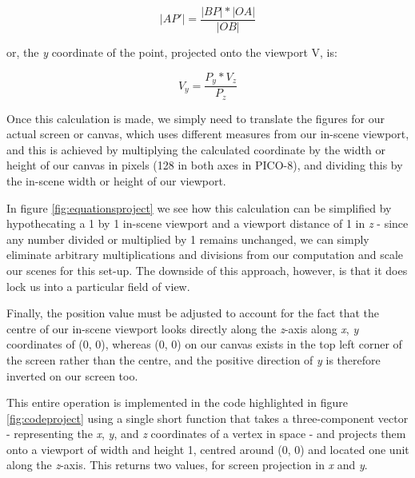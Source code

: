 \documentclass[11pt]{article}
\begin{document}
\begin{equation}
   |AP'| = \frac{|BP| * |OA|} {|OB|}
\end{equation}

or, the \textit{y} coordinate of the point, projected onto the viewport V, is:

\begin{equation}
   V_y = \frac{P_y * V_z} {P_z}
\end{equation}

Once this calculation is made, we simply need to translate the figures for our actual screen or canvas, which uses different
measures from our in-scene viewport, and this is achieved by multiplying the calculated coordinate by the width or height of
our canvas in pixels (128 in both axes in PICO-8), and dividing this by the in-scene width or height of our viewport.

In figure \ref{fig:equationsproject} we see how this calculation can be simplified by hypothecating a 1 by 1 in-scene viewport and
a viewport distance of 1 in \textit{z} - since any number divided or multiplied by 1 remains unchanged, we can simply eliminate
arbitrary multiplications and divisions from our computation and scale our scenes for this set-up. The downside of this approach,
however, is that it does lock us into a particular field of view.

Finally, the position value must be adjusted to account for the fact that the centre of our in-scene viewport looks directly
along the \textit{z}-axis along \textit{x}, \textit{y} coordinates of (0, 0), whereas (0, 0) on our canvas exists
in the top left corner of the screen rather than the centre, and the positive direction of \textit{y} is therefore
inverted on our screen too.

This entire operation is implemented in the code highlighted in figure \ref{fig:codeproject} using a single short function
that takes a three-component vector - representing the \textit{x}, \textit{y}, and \textit{z} coordinates of a
vertex in space - and projects them onto a viewport of width and height 1, centred around (0, 0) and located
one unit along the \textit{z}-axis. This returns two values, for screen projection in \textit{x} and \textit{y}.
\end{document}

